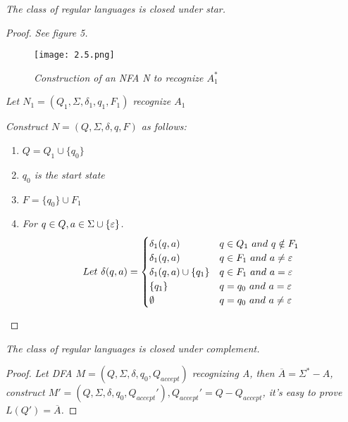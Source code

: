 \documentclass{article}
\begin{document}
\begin{thm}
    \textit{The class of regular languages is closed under star.}
    \begin{proof}
        \textit{See figure 5.}

        \begin{figure}[H]
            \centering
            \texttt{[image: 2.5.png]}
            \caption{\textit{Construction of an NFA N to recognize $A_1^*$}}
        \end{figure}
        \textit{Let $N_1 = (Q_1,\Sigma,\delta_1,q_1,F_1)$ recognize $A_1$}

        \textit{Construct $N = (Q,\Sigma,\delta,q,F)$ as follows:}

        \begin{enumerate}
            \item $Q = Q_1\cup \{q_0\}$
            \item \textit{$q_0$ is the start state}
            \item $F = \{q_0\}\cup F_1$
            \item \textit{For $q\in Q,a\in \Sigma\cup\{\varepsilon\}$.}
            \[ 
                Let ~ \delta(q,a) = 
                \begin{cases}
                    \delta_1(q,a) & q\in Q_1~and~q\notin F_1 \\
                    \delta_1(q,a) & q\in F_1~and~a\neq\varepsilon \\
                    \delta_1(q,a)\cup\{q_1\} & q\in F_1~and~a=\varepsilon \\
                    \{q_1\} & q = q_0 ~ and ~ a = \varepsilon \\
                    \emptyset & q = q_0 ~ and ~ a \neq \varepsilon \\
                \end{cases}
            \]
        \end{enumerate}
    \end{proof}
\end{thm}

\begin{thm}
    \textit{The class of regular languages is closed under complement.}
    \begin{proof}
        \textit{Let DFA $M = (Q,\Sigma,\delta,q_0,Q_{accept})$ recognizing A, then $\overline{A} = \Sigma^*-A$,\\ construct $M' = (Q,\Sigma,\delta,q_0,Q_{accept}'),Q_{accept}' = Q - Q_{accept}$, it's easy to prove $L(Q') = \overline{A}$.}
    \end{proof}
\end{thm}
\end{document}
